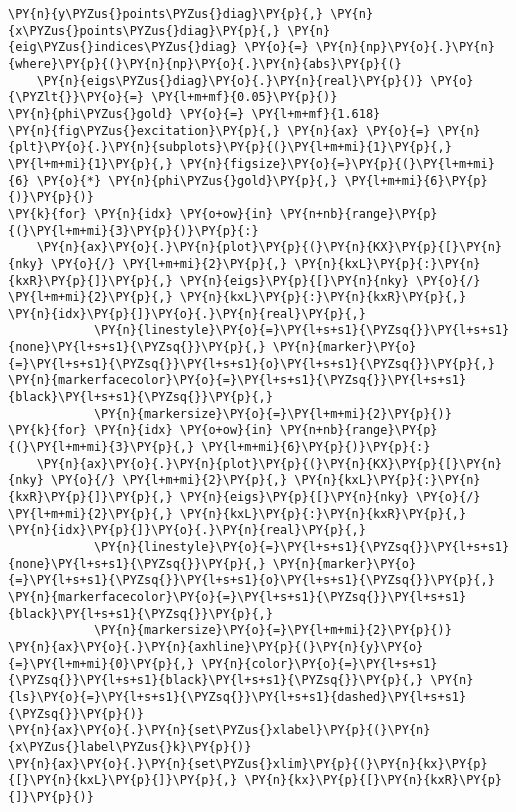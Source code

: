 \begin{Verbatim}[commandchars=\\\{\}]
\PY{n}{y\PYZus{}points\PYZus{}diag}\PY{p}{,} \PY{n}{x\PYZus{}points\PYZus{}diag}\PY{p}{,} \PY{n}{eig\PYZus{}indices\PYZus{}diag} \PY{o}{=} \PY{n}{np}\PY{o}{.}\PY{n}{where}\PY{p}{(}\PY{n}{np}\PY{o}{.}\PY{n}{abs}\PY{p}{(}
    \PY{n}{eigs\PYZus{}diag}\PY{o}{.}\PY{n}{real}\PY{p}{)} \PY{o}{\PYZlt{}}\PY{o}{=} \PY{l+m+mf}{0.05}\PY{p}{)}
\PY{n}{phi\PYZus{}gold} \PY{o}{=} \PY{l+m+mf}{1.618}
\PY{n}{fig\PYZus{}excitation}\PY{p}{,} \PY{n}{ax} \PY{o}{=} \PY{n}{plt}\PY{o}{.}\PY{n}{subplots}\PY{p}{(}\PY{l+m+mi}{1}\PY{p}{,} \PY{l+m+mi}{1}\PY{p}{,} \PY{n}{figsize}\PY{o}{=}\PY{p}{(}\PY{l+m+mi}{6} \PY{o}{*} \PY{n}{phi\PYZus{}gold}\PY{p}{,} \PY{l+m+mi}{6}\PY{p}{)}\PY{p}{)}
\PY{k}{for} \PY{n}{idx} \PY{o+ow}{in} \PY{n+nb}{range}\PY{p}{(}\PY{l+m+mi}{3}\PY{p}{)}\PY{p}{:}
    \PY{n}{ax}\PY{o}{.}\PY{n}{plot}\PY{p}{(}\PY{n}{KX}\PY{p}{[}\PY{n}{nky} \PY{o}{/} \PY{l+m+mi}{2}\PY{p}{,} \PY{n}{kxL}\PY{p}{:}\PY{n}{kxR}\PY{p}{]}\PY{p}{,} \PY{n}{eigs}\PY{p}{[}\PY{n}{nky} \PY{o}{/} \PY{l+m+mi}{2}\PY{p}{,} \PY{n}{kxL}\PY{p}{:}\PY{n}{kxR}\PY{p}{,} \PY{n}{idx}\PY{p}{]}\PY{o}{.}\PY{n}{real}\PY{p}{,}
            \PY{n}{linestyle}\PY{o}{=}\PY{l+s+s1}{\PYZsq{}}\PY{l+s+s1}{none}\PY{l+s+s1}{\PYZsq{}}\PY{p}{,} \PY{n}{marker}\PY{o}{=}\PY{l+s+s1}{\PYZsq{}}\PY{l+s+s1}{o}\PY{l+s+s1}{\PYZsq{}}\PY{p}{,} \PY{n}{markerfacecolor}\PY{o}{=}\PY{l+s+s1}{\PYZsq{}}\PY{l+s+s1}{black}\PY{l+s+s1}{\PYZsq{}}\PY{p}{,}
            \PY{n}{markersize}\PY{o}{=}\PY{l+m+mi}{2}\PY{p}{)}
\PY{k}{for} \PY{n}{idx} \PY{o+ow}{in} \PY{n+nb}{range}\PY{p}{(}\PY{l+m+mi}{3}\PY{p}{,} \PY{l+m+mi}{6}\PY{p}{)}\PY{p}{:}
    \PY{n}{ax}\PY{o}{.}\PY{n}{plot}\PY{p}{(}\PY{n}{KX}\PY{p}{[}\PY{n}{nky} \PY{o}{/} \PY{l+m+mi}{2}\PY{p}{,} \PY{n}{kxL}\PY{p}{:}\PY{n}{kxR}\PY{p}{]}\PY{p}{,} \PY{n}{eigs}\PY{p}{[}\PY{n}{nky} \PY{o}{/} \PY{l+m+mi}{2}\PY{p}{,} \PY{n}{kxL}\PY{p}{:}\PY{n}{kxR}\PY{p}{,} \PY{n}{idx}\PY{p}{]}\PY{o}{.}\PY{n}{real}\PY{p}{,}
            \PY{n}{linestyle}\PY{o}{=}\PY{l+s+s1}{\PYZsq{}}\PY{l+s+s1}{none}\PY{l+s+s1}{\PYZsq{}}\PY{p}{,} \PY{n}{marker}\PY{o}{=}\PY{l+s+s1}{\PYZsq{}}\PY{l+s+s1}{o}\PY{l+s+s1}{\PYZsq{}}\PY{p}{,} \PY{n}{markerfacecolor}\PY{o}{=}\PY{l+s+s1}{\PYZsq{}}\PY{l+s+s1}{black}\PY{l+s+s1}{\PYZsq{}}\PY{p}{,}
            \PY{n}{markersize}\PY{o}{=}\PY{l+m+mi}{2}\PY{p}{)}
\PY{n}{ax}\PY{o}{.}\PY{n}{axhline}\PY{p}{(}\PY{n}{y}\PY{o}{=}\PY{l+m+mi}{0}\PY{p}{,} \PY{n}{color}\PY{o}{=}\PY{l+s+s1}{\PYZsq{}}\PY{l+s+s1}{black}\PY{l+s+s1}{\PYZsq{}}\PY{p}{,} \PY{n}{ls}\PY{o}{=}\PY{l+s+s1}{\PYZsq{}}\PY{l+s+s1}{dashed}\PY{l+s+s1}{\PYZsq{}}\PY{p}{)}
\PY{n}{ax}\PY{o}{.}\PY{n}{set\PYZus{}xlabel}\PY{p}{(}\PY{n}{x\PYZus{}label\PYZus{}k}\PY{p}{)}
\PY{n}{ax}\PY{o}{.}\PY{n}{set\PYZus{}xlim}\PY{p}{(}\PY{n}{kx}\PY{p}{[}\PY{n}{kxL}\PY{p}{]}\PY{p}{,} \PY{n}{kx}\PY{p}{[}\PY{n}{kxR}\PY{p}{]}\PY{p}{)}

\end{Verbatim}
